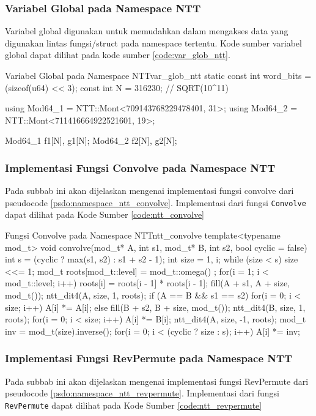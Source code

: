 \subsubsection{Variabel Global pada Namespace NTT}
Variabel global digunakan untuk memudahkan dalam mengakses data yang digunakan lintas fungsi/struct pada namespace tertentu. Kode sumber variabel global dapat dilihat pada kode sumber \ref{code:var_glob_ntt}. 

\begin{code}[firstnumber=1]{Variabel Global pada Namespace NTT}{var_glob_ntt}
	static const int word_bits = (sizeof(u64) << 3);
	const int N = 316230; // SQRT(10^11)

	using Mod64_1 = NTT::Mont<709143768229478401, 31>;
	using Mod64_2 = NTT::Mont<711416664922521601, 19>;

	Mod64_1 f1[N], g1[N];
	Mod64_2 f2[N], g2[N];
\end{code}

\subsubsection{Implementasi Fungsi Convolve pada Namespace NTT}
Pada subbab ini akan dijelaskan mengenai implementasi fungsi convolve dari pseudocode \ref{psdo:namespace_ntt_convolve}. Implementasi dari fungsi \texttt{Convolve} dapat dilihat pada Kode Sumber \ref{code:ntt_convolve}

\begin{code}[firstnumber=1]{Fungsi Convolve pada Namespace NTT}{ntt_convolve}
	template<typename mod_t>
    void convolve(mod_t* A, int s1, mod_t* B, int s2, bool cyclic = false) {
        int s = (cyclic ? max(s1, s2) : s1 + s2 - 1);
        int size = 1, i;
        while (size < s) size <<= 1;
        mod_t roots[mod_t::level] = { mod_t::omega() };
        for(i = 1; i < mod_t::level; i++) roots[i] = roots[i - 1] * roots[i - 1];
        fill(A + s1, A + size, mod_t()); ntt_dit4(A, size, 1, roots);
        if (A == B && s1 == s2) {
            for(i = 0; i < size; i++) A[i] *= A[i];
        } else {
            fill(B + s2, B + size, mod_t()); ntt_dit4(B, size, 1, roots);
            for(i = 0; i < size; i++)  A[i] *= B[i];
        }
        ntt_dit4(A, size, -1, roots);
        mod_t inv = mod_t(size).inverse();
        for(i = 0; i < (cyclic ? size : s); i++) A[i] *= inv;
    }
\end{code}

\subsubsection{Implementasi Fungsi RevPermute pada Namespace NTT}
Pada subbab ini akan dijelaskan mengenai implementasi fungsi RevPermute dari pseudocode \ref{psdo:namespace_ntt_revpermute}. Implementasi dari fungsi \texttt{RevPermute} dapat dilihat pada Kode Sumber \ref{code:ntt_revpermute}

